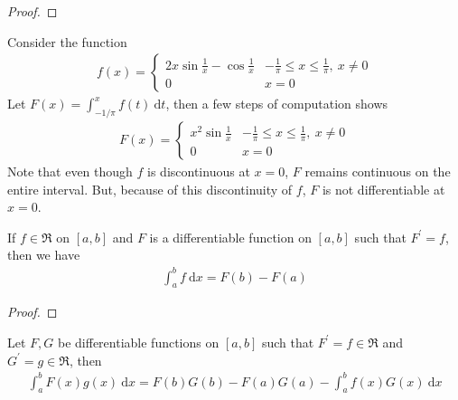 \documentclass[thmcnt=section, 12pt]{elegantbook}
\begin{document}
\begin{proof}
\end{proof}

\begin{example}
    Consider the function 
    \begin{align*}
        f(x) = \begin{cases}
            2x \sin \frac{1}{x} - \cos \frac{1}{x} &-\frac{1}{\pi} \leq x \leq \frac{1}{\pi}, \ x \neq 0 \\ 
            0 &x = 0
        \end{cases}
    \end{align*}
    Let $F(x) = \int_{-1/\pi}^{x} f(t) \ \mathrm{d} t$, then a few steps of computation shows 
    \begin{align*}
        F(x) = \begin{cases}
            x^2 \sin \frac{1}{x}  &-\frac{1}{\pi} \leq x \leq \frac{1}{\pi}, \ x \neq 0 \\ 
            0 &x = 0
        \end{cases}
    \end{align*}
    Note that even though $f$ is discontinuous at $x = 0$, $F$ remains continuous on the entire interval. But, because of this discontinuity of $f$,  $F$ is not differentiable at $x=0$.
\end{example}


\begin{theorem} \label{thm:1}
    If $ f \in \mathfrak{R} $ on $[a, b]$ and $F$ is a differentiable function on $[a, b]$ such that $F^\prime = f$, then we have
    \begin{align*}
        \int_a^b f \ \mathrm{d} x = F(b) - F(a)
    \end{align*}
\end{theorem}

\begin{proof}
\end{proof}


\begin{theorem} \label{thm:2}
    Let $F, G$ be differentiable functions on $[a, b]$ such that $F^\prime = f \in \mathfrak{R}$ and $G^\prime = g \in \mathfrak{R}$, then 
    \begin{align*}
        \int_a^b F(x)g(x) \ \mathrm{d} x = F(b)G(b) - F(a)G(a) - \int_a^b f(x)G(x) \ \mathrm{d} x
    \end{align*}
\end{theorem}
\end{document}
